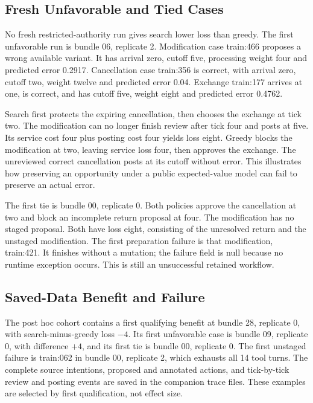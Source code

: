 \subsection{Fresh Unfavorable and Tied Cases}

No fresh restricted-authority run gives search lower loss than greedy. The first unfavorable run is bundle 06, replicate 2. Modification case train:466 proposes a wrong available variant. It has arrival zero, cutoff five, processing weight four and predicted error 0.2917. Cancellation case train:356 is correct, with arrival zero, cutoff two, weight twelve and predicted error 0.04. Exchange train:177 arrives at one, is correct, and has cutoff five, weight eight and predicted error 0.4762.

Search first protects the expiring cancellation, then chooses the exchange at tick two. The modification can no longer finish review after tick four and posts at five. Its service cost four plus posting cost four yields loss eight. Greedy blocks the modification at two, leaving service loss four, then approves the exchange. The unreviewed correct cancellation posts at its cutoff without error. This illustrates how preserving an opportunity under a public expected-value model can fail to preserve an actual error.

The first tie is bundle 00, replicate 0. Both policies approve the cancellation at two and block an incomplete return proposal at four. The modification has no staged proposal. Both have loss eight, consisting of the unresolved return and the unstaged modification. The first preparation failure is that modification, train:421. It finishes without a mutation; the failure field is null because no runtime exception occurs. This is still an unsuccessful retained workflow.

\subsection{Saved-Data Benefit and Failure}

The post hoc cohort contains a first qualifying benefit at bundle 28, replicate 0, with search-minus-greedy loss $-4$. Its first unfavorable case is bundle 09, replicate 0, with difference $+4$, and its first tie is bundle 00, replicate 0. The first unstaged failure is train:062 in bundle 00, replicate 2, which exhausts all 14 tool turns. The complete source intentions, proposed and annotated actions, and tick-by-tick review and posting events are saved in the companion trace files. These examples are selected by first qualification, not effect size.
